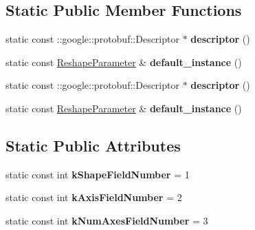 \subsection*{Static Public Member Functions}
\begin{DoxyCompactItemize}
\item 
\mbox{\label{classcaffe_1_1_reshape_parameter_a3d56205e728ab91f5982ed9601923ba2}} 
static const \+::google\+::protobuf\+::\+Descriptor $\ast$ {\bfseries descriptor} ()
\item 
\mbox{\label{classcaffe_1_1_reshape_parameter_ab0104d877ce02fe6a1d5ea5428ed9d4f}} 
static const \mbox{\hyperlink{classcaffe_1_1_reshape_parameter}{Reshape\+Parameter}} \& {\bfseries default\+\_\+instance} ()
\item 
\mbox{\label{classcaffe_1_1_reshape_parameter_a0984034e54aa26933a5f2dc91f1c16db}} 
static const \+::google\+::protobuf\+::\+Descriptor $\ast$ {\bfseries descriptor} ()
\item 
\mbox{\label{classcaffe_1_1_reshape_parameter_abb3a269e993fa6979af1cef2fa573de6}} 
static const \mbox{\hyperlink{classcaffe_1_1_reshape_parameter}{Reshape\+Parameter}} \& {\bfseries default\+\_\+instance} ()
\end{DoxyCompactItemize}
\subsection*{Static Public Attributes}
\begin{DoxyCompactItemize}
\item 
\mbox{\label{classcaffe_1_1_reshape_parameter_a2d2f8563629378ac27aac47514e9ca1c}} 
static const int {\bfseries k\+Shape\+Field\+Number} = 1
\item 
\mbox{\label{classcaffe_1_1_reshape_parameter_a718173f220e04bd85970890863a6cf55}} 
static const int {\bfseries k\+Axis\+Field\+Number} = 2
\item 
\mbox{\label{classcaffe_1_1_reshape_parameter_a073d6621e89b5d72402f2783473fc97d}} 
static const int {\bfseries k\+Num\+Axes\+Field\+Number} = 3
\end{DoxyCompactItemize}
